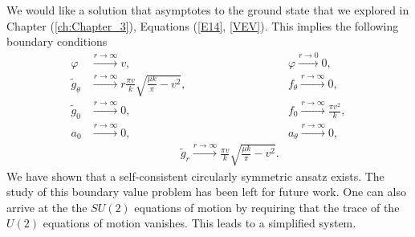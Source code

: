 We would like a solution that asymptotes to the ground state that we explored in Chapter (\ref{ch:Chapter_3}), Equations (\ref{E14}, \ref{VEV}). This implies the following boundary conditions
\begin{align}
    \varphi &\xrightarrow{r \rightarrow \infty} v, \qquad \qquad \qquad & \varphi \xrightarrow{r \rightarrow 0} 0,\\
    \tilde{g}_{\theta} &\xrightarrow{r \rightarrow \infty} r \frac{\pi v}{k} \sqrt{ \frac{\mu k}{\pi} -v^2}, &f_{\theta} \xrightarrow{r \rightarrow \infty}0,\\ 
    \tilde{g}_0 &\xrightarrow{r \rightarrow \infty} 0, &f_0  \xrightarrow{r \rightarrow \infty}\frac{\pi v^2}{k},\\
     a_0 &\xrightarrow{r \rightarrow \infty} 0, &a_{\theta} \xrightarrow{r \rightarrow \infty} 0,\\
    & \qquad\qquad\qquad\qquad  \tilde{g}_r \xrightarrow{r \rightarrow \infty} \frac{\pi v}{k} \sqrt{ \frac{\mu k}{\pi} -v^2}.  & 
\end{align}
We have shown that a self-consistent circularly symmetric ansatz exists. The study of this boundary value problem has been left for future work. One can also arrive at the the $SU(2)$ equations of motion by requiring that the trace of the $U(2)$ equations of motion vanishes. This leads to a simplified system.

